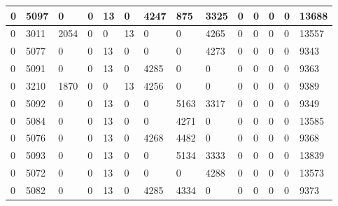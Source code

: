 \begin{tabular}{ | l | l | l | l | l | l | l | l | l | l | l | l | l || l | }
	0 & 5097 & 0 & 0 & 13 & 0 & 4247 & 875 & 3325 & 0 & 0 & 0 & 0 & 13688 \\ \hline
	0 & 3011 & 2054 & 0 & 0 & 13 & 0 & 0 & 4265 & 0 & 0 & 0 & 0 & 13557 \\ \hline
	0 & 5077 & 0 & 0 & 13 & 0 & 0 & 0 & 4273 & 0 & 0 & 0 & 0 & 9343 \\ \hline
	0 & 5091 & 0 & 0 & 13 & 0 & 4285 & 0 & 0 & 0 & 0 & 0 & 0 & 9363 \\ \hline
	0 & 3210 & 1870 & 0 & 0 & 13 & 4256 & 0 & 0 & 0 & 0 & 0 & 0 & 9389 \\ \hline
	0 & 5092 & 0 & 0 & 13 & 0 & 0 & 5163 & 3317 & 0 & 0 & 0 & 0 & 9349 \\ \hline
	0 & 5084 & 0 & 0 & 13 & 0 & 0 & 4271 & 0 & 0 & 0 & 0 & 0 & 13585 \\ \hline
	0 & 5076 & 0 & 0 & 13 & 0 & 4268 & 4482 & 0 & 0 & 0 & 0 & 0 & 9368 \\ \hline
	0 & 5093 & 0 & 0 & 13 & 0 & 0 & 5134 & 3333 & 0 & 0 & 0 & 0 & 13839 \\ \hline
	0 & 5072 & 0 & 0 & 13 & 0 & 0 & 0 & 4288 & 0 & 0 & 0 & 0 & 13573 \\ \hline
	0 & 5082 & 0 & 0 & 13 & 0 & 4285 & 4334 & 0 & 0 & 0 & 0 & 0 & 9373 \\ \hline
\end{tabular}

